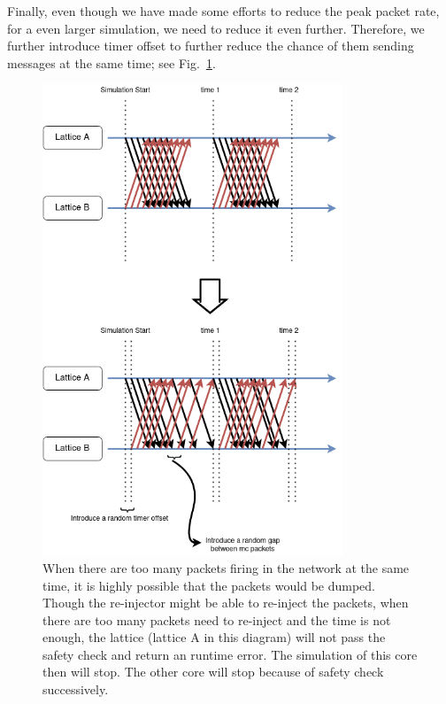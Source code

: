 Finally, even though we have made some efforts to reduce the peak packet rate, for a even larger simulation, we need to reduce it even further. Therefore, we further introduce timer offset to further reduce the chance of them sending messages at the same time; see Fig.~\ref{fig:packet_offset}.\\

\begin{figure}[!tb]
   \centering
       \includegraphics[width=0.8\textwidth]{figures/optimize.png}
       \caption{When there are too many packets firing in the network at the same time, it is highly possible that the packets would be dumped. Though the re-injector might be able to re-inject the packets, when there are too many packets need to re-inject and the time is not enough, the lattice (lattice A in this diagram) will not pass the safety check and return an runtime error. The simulation of this core then will stop. The other core will stop because of safety check successively.}
       \label{fig:packet_offset}
\end{figure}


